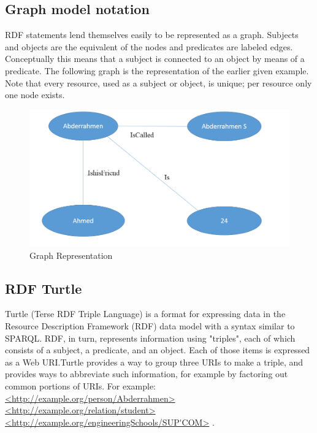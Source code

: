 \documentclass[a4paper,12pt,oneside]{report}
\begin{document}
{{{\subsection{Graph model notation}
{RDF statements lend themselves easily to be represented as a graph. Subjects and objects are the equivalent of the nodes and predicates are labeled edges. Conceptually this means that a subject is connected to an object by means of a predicate. The following graph is the
representation of the earlier given example. Note that every resource, used as a subject or object, is unique; per resource only one node exists.
\begin{figure}[ht]
\centering
\includegraphics[width=1\textwidth]{Capture20}
\caption{Graph Representation}
\end{figure}
}
\subsection{RDF Turtle}
{Turtle (Terse RDF Triple Language) is a format for expressing data in the Resource Description Framework (RDF) data model with a syntax similar to SPARQL. RDF, in turn, represents information using "triples", each of which consists of a subject, a predicate, and an object. Each of those items is expressed as a Web URI.Turtle provides a way to group three URIs to make a triple, and provides ways to abbreviate such information, for example by factoring out common portions of URIs. For example:\\
\url{<http://example.org/person/Abderrahmen>} \url{<http://example.org/relation/student>}  \url{<http://example.org/engineeringSchools/SUP'COM>} .}
}}}
\end{document}
